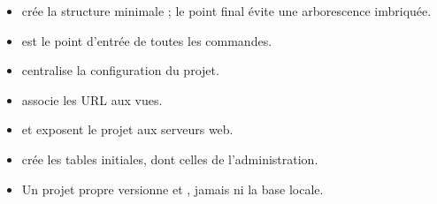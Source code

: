 \begin{retenir}
\begin{itemize}
  \item {} crée la structure minimale ; le point final évite une
        arborescence imbriquée.
  \item {} est le point d'entrée de toutes les commandes.
  \item {} centralise la configuration du projet.
  \item {} associe les URL aux vues.
  \item {} et  exposent le projet aux serveurs web.
  \item {} crée les tables initiales, dont celles de l'administration.
  \item Un projet propre versionne  et ,
        jamais  ni la base locale.
\end{itemize}
\end{retenir}
